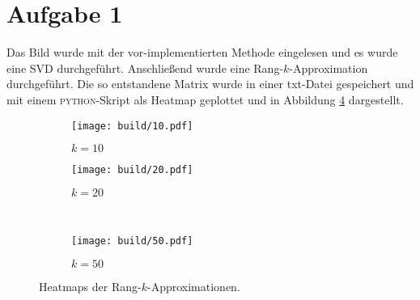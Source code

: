 \section{Aufgabe 1}
Das Bild wurde mit der vor-implementierten Methode eingelesen und es wurde
eine SVD durchgeführt. Anschließend wurde eine Rang-$k$-Approximation durchgeführt.
Die so entstandene Matrix wurde in einer txt-Datei gespeichert und mit einem
\textsc{python}-Skript als Heatmap geplottet und in Abbildung \ref{fig:1}
dargestellt.
\begin{figure}
  \centering
  \begin{subfigure}{0.49\textwidth}
    \texttt{[image: build/10.pdf]}
    \caption{$k = 10$}
    \label{sub:10}
  \end{subfigure}
  \begin{subfigure}{0.49\textwidth}
    \texttt{[image: build/20.pdf]}
    \caption{$k = 20$}
    \label{sub:20}
  \end{subfigure}
  \\
  \centering
  \begin{subfigure}{0.49\textwidth}
    \texttt{[image: build/50.pdf]}
    \caption{$k = 50$}
    \label{sub:50}
  \end{subfigure}
  \caption{Heatmaps der Rang-$k$-Approximationen.}
  \label{fig:1}
\end{figure}
